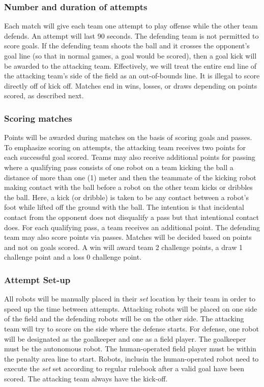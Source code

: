 \subsubsection{Number and duration of attempts}
Each match will give each team one attempt to play offense while the other team defends. An attempt will last 90 seconds. The defending team is not permitted to score goals. If the defending team shoots the ball and it crosses the opponent’s goal line (so that in normal games, a goal would be scored), then a goal kick will be awarded to the attacking team. Effectively, we will treat the entire end line of the attacking team's side of the field as an out-of-bounds line. It is illegal to score directly off of kick off. Matches end in wins, losses, or draws depending on points scored, as described next. 

\subsubsection{Scoring matches}
Points will be awarded during matches on the basis of scoring goals and passes. To emphasize scoring on attempts, the attacking team receives two points for each successful goal scored. Teams may also receive additional points for passing where a qualifying pass consists of one robot on a team kicking the ball a distance of more than one (1) meter and then the teammate of the kicking robot making contact with the ball before a robot on the other team kicks or dribbles the ball. Here, a kick (or dribble) is taken to be any contact between a robot's foot while lifted off the ground with the ball. The intention is that incidental contact from the opponent does not disqualify a pass but that intentional contact does. For each qualifying pass, a team receives an additional point. The defending team may also score points via passes. Matches will be decided based on points and not on goals scored.
A win will award team 2 challenge points, a draw 1 challenge point and a loss 0 challenge point.

\subsubsection{Attempt Set-up}
All robots will be manually placed in their \textit{set} location by their team in order to speed up the time between attempts.  Attacking robots will be placed on one side of the field and the defending robots will be on the other side. The attacking team will try to score on the side where the defense starts. For defense, one robot will be designated as the goalkeeper and one as a field player. The goalkeeper must be the autonomous robot. The human-operated field player must be within the penalty area line to start.
Robots, inclusin the human-operated robot need to execute the \textit{set} set according to regular rulebook after a valid goal have been scored. The attacking team always have the kick-off. 


